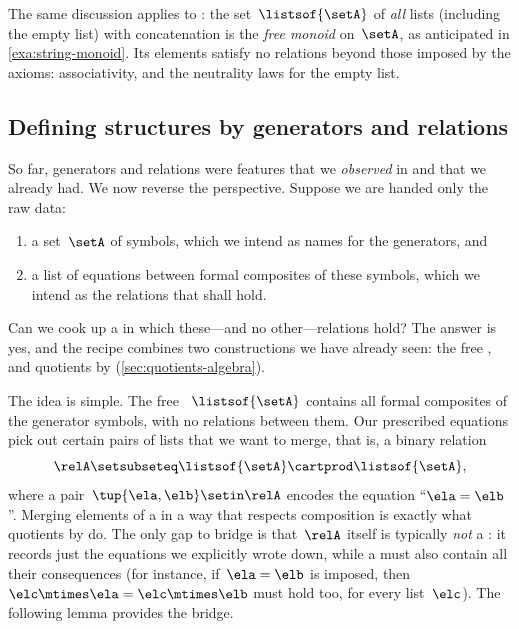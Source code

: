 \begin{remark}
    The same discussion applies to : the set~$\listsof{\setA}$ of \emph{all} lists (including the empty list) with concatenation is the \emph{free monoid} on~$\setA$, as anticipated in \cref{exa:string-monoid}.
    Its elements satisfy no relations beyond those imposed by the  axioms: associativity, and the neutrality laws for the empty list.
\end{remark}

\subsection{Defining structures by generators and relations}
\label{sub:presentations}

So far, generators and relations were features that we \emph{observed} in  and  that we already had.
We now reverse the perspective.
Suppose we are handed only the raw data:
\begin{enumerate}
    \item a set~$\setA$ of symbols, which we intend as names for the generators, and
    \item a list of equations between formal composites of these symbols, which we intend as the relations that shall hold.
\end{enumerate}
Can we cook up a  in which these---and no other---relations hold?
The answer is yes, and the recipe combines two constructions we have already seen: the free , and quotients by  (\cref{sec:quotients-algebra}).

The idea is simple.
The free ~$\listsof{\setA}$ contains all formal composites of the generator symbols, with no relations between them.
Our prescribed equations pick out certain pairs of lists that we want to merge, that is, a binary relation
\begin{equation}
    \relA \setsubseteq \listsof{\setA} \cartprod \listsof{\setA},
\end{equation}
where a pair~$\tup{\ela, \elb} \setin \relA$ encodes the equation ``$\ela = \elb$''.
Merging elements of a  in a way that respects composition is exactly what quotients by  do.
The only gap to bridge is that~$\relA$ itself is typically \emph{not} a : it records just the equations we explicitly wrote down, while a  must also contain all their consequences (for instance, if~$\ela = \elb$ is imposed, then~$\elc \mtimes \ela = \elc \mtimes \elb$ must hold too, for every list~$\elc$).
The following lemma provides the bridge.


